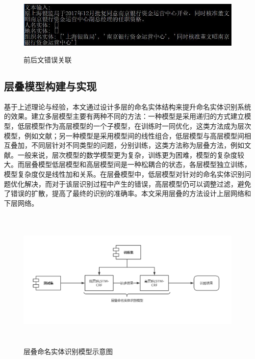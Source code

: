 \documentclass[winfonts,master,oneside,nobackinfo]{njuthesis}
\begin{document}
\begin{figure}[H]
\centering
\begin{minipage}[t]{\textwidth}
\includegraphics[width=1\textwidth,height=3cm]{./figure/前后文错误关联.jpg}
\caption{前后文错误关联}
\label{lab:1}
\end{minipage}
\end{figure}

\subsection{层叠模型构建与实现}

基于上述理论与经验，本文通过设计多层的命名实体结构来提升命名实体识别系统的效果。建立多层模型主要有两种不同的方法：一种模型是采用递归的方式建立模型，低层模型作为高层模型的一个子模型，在训练时一同优化，这类方法成为层次模型，例如文献\cite{taobao}；另一种模型是采用模型间的线性组合，低层模型与高层模型间相互叠加，不同层针对不同类型的问题，分别训练，这类方法称为层叠方法，例如文献\cite{Yixue}\cite{Jia}。一般来说，层次模型的数学模型更为复杂，训练更为困难，模型的复杂度较大。而层叠模型低层模型和高层模型间是一种松耦合的状态，各层模型独立训练，模型复杂度仅是线性加和关系。在层叠模型中，低层模型对针对的命名实体识别问题优化解决，而对于该层识别过程中产生的错误，高层模型仍可以调整过滤，避免了错误的扩散，提高了最终的识别的准确率。本文采用层叠的方法设计上层网络和下层网络。

\begin{figure}[H]
\centering
\begin{minipage}[t]{\textwidth}
\includegraphics[width=1\textwidth,height=7cm]{./figure/层叠模型.jpg}
\caption{层叠命名实体识别模型示意图}
\label{lab:1}
\end{minipage}
\end{figure}
\end{document}
